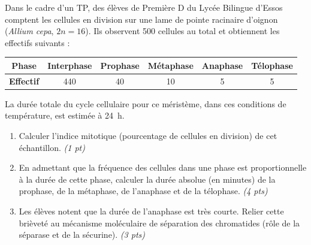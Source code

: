 \documentclass[11pt]{article}
\begin{document}
\begin{exercice}
Dans le cadre d'un TP, des élèves de Première D du Lycée Bilingue d'Essos comptent les cellules en division sur une lame de pointe racinaire d'oignon (\textit{Allium cepa}, $2n = 16$). Ils observent 500 cellules au total et obtiennent les effectifs suivants :
\begin{center}
\begin{tabular}{|c|c|c|c|c|c|}
\hline
\textbf{Phase} & Interphase & Prophase & Métaphase & Anaphase & Télophase \\
\hline
\textbf{Effectif} & 440 & 40 & 10 & 5 & 5 \\
\hline
\end{tabular}
\end{center}
La durée totale du cycle cellulaire pour ce méristème, dans ces conditions de température, est estimée à \SI{24}{\hour}.
\begin{enumerate}
    \item Calculer l'indice mitotique (pourcentage de cellules en division) de cet échantillon. \textit{(1 pt)}
    \item En admettant que la fréquence des cellules dans une phase est proportionnelle à la durée de cette phase, calculer la durée absolue (en minutes) de la prophase, de la métaphase, de l'anaphase et de la télophase. \textit{(4 pts)}
    \item Les élèves notent que la durée de l'anaphase est très courte. Relier cette brièveté au mécanisme moléculaire de séparation des chromatides (rôle de la séparase et de la sécurine). \textit{(3 pts)}
\end{enumerate}
\end{exercice}
\end{document}
